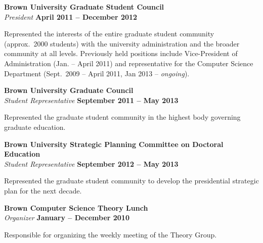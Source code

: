\documentclass[margin,line]{resume}
\begin{document}
{\bf Brown University Graduate Student Council}\\
{\em President} \hfill {\bf April 2011 -- December 2012}

\begin{list2}
\vspace*{.05in}
\item Represented the interests of the entire graduate student community
  (approx.~2000 students) with the university administration and the broader
  community at all levels. Previously held positions include Vice-President of
  Administration (Jan. -- April 2011) and representative for the Computer Science
  Department (Sept.~2009 -- April 2011, Jan 2013 -- \emph{ongoing}).
\end{list2}

{\bf Brown University Graduate Council}\\
{\em Student Representative} \hfill {\bf September 2011 -- May 2013}

\begin{list2}
\vspace*{.05in}
\item Represented the graduate student community in the highest
  body governing graduate education.
\end{list2}

{\bf Brown University Strategic Planning Committee on Doctoral Education}\\
{\em Student Representative} \hfill {\bf September 2012 -- May 2013}

\begin{list2}
\vspace*{.05in}
\item Represented the graduate student community to develop
  the presidential strategic plan for the next decade.
\end{list2}

{\bf Brown Computer Science Theory Lunch}\\ 
{\em Organizer} \hfill {\bf January -- December 2010 }

\begin{list2}
\vspace*{.05in}
\item Responsible for organizing the weekly meeting of the Theory Group. 
\end{list2}
\end{document}
